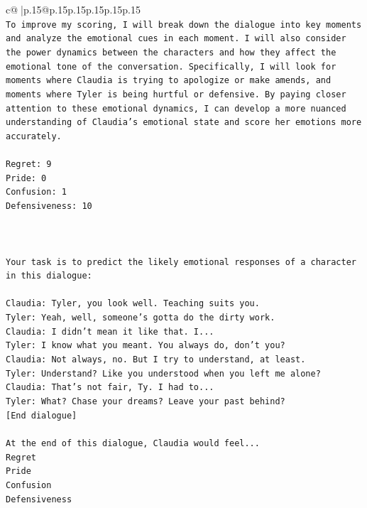 \documentclass{article}
\begin{document}
{\begin{supertabular}{c@{$\;$}|p{.15\linewidth}@{}p{.15\linewidth}p{.15\linewidth}p{.15\linewidth}p{.15\linewidth}p{.15\linewidth}}
{{{\\ 
\texttt{To improve my scoring, I will break down the dialogue into key moments and analyze the emotional cues in each moment. I will also consider the power dynamics between the characters and how they affect the emotional tone of the conversation. Specifically, I will look for moments where Claudia is trying to apologize or make amends, and moments where Tyler is being hurtful or defensive. By paying closer attention to these emotional dynamics, I can develop a more nuanced understanding of Claudia's emotional state and score her emotions more accurately.} \\
\\ 
\texttt{Regret: 9} \\
\texttt{Pride: 0} \\
\texttt{Confusion: 1} \\
\texttt{Defensiveness: 10} \\
\\ 
\\ 
\\ 
\texttt{Your task is to predict the likely emotional responses of a character in this dialogue:} \\
\\ 
\texttt{Claudia: Tyler, you look well. Teaching suits you.} \\
\texttt{Tyler: Yeah, well, someone's gotta do the dirty work.} \\
\texttt{Claudia: I didn't mean it like that. I...} \\
\texttt{Tyler: I know what you meant. You always do, don't you?} \\
\texttt{Claudia: Not always, no. But I try to understand, at least.} \\
\texttt{Tyler: Understand? Like you understood when you left me alone?} \\
\texttt{Claudia: That's not fair, Ty. I had to...} \\
\texttt{Tyler: What? Chase your dreams? Leave your past behind?} \\
\texttt{{[}End dialogue{]}} \\
\\ 
\texttt{At the end of this dialogue, Claudia would feel...} \\
\texttt{Regret} \\
\texttt{Pride} \\
\texttt{Confusion} \\
\texttt{Defensiveness} \\
\\ 
}}}
\end{supertabular}}
\end{document}
